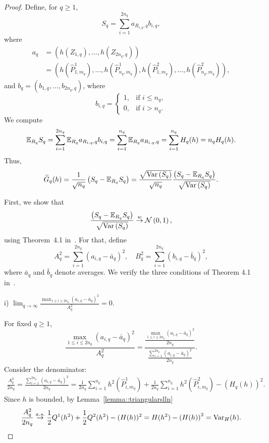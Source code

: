 \begin{proof}
Define, for $q \geq 1$,
\[
S_q = \sum_{i = 1}^{2n_q} a_{R_{i,q},q} b_{i,q},
\]
where
\begin{align*}
a_q & = \left(h\left(Z_{1, q}\right),\dots,h\left(Z_{2n_q,q}\right)\right)\\
& = \left(h\left(\widehat{P}^1_{1,m_q}\right),\dots, h\left(\widehat{P}^1_{n_q,m_q}\right), h\left(\widehat{P}^2_{1,m_q}\right),\dots, h\left(\widehat{P}^2_{n_q,m_q}\right)\right),
\end{align*}
and $b_q = \left(b_{1,q},\dots, b_{2n_q,q} \right)$, where
\[
b_{i,q} =
\begin{cases}
1, & \text{if } i \leq n_q, \\
0, & \text{if } i > n_q .
\end{cases}
\]
We compute
\[
\mathbb{E}_{R_q} S_q
= \sum_{i = 1}^{2n_q} \mathbb{E}_{R_q} a_{R_{i,q},q} b_{i,q}
= \sum_{i = 1}^{n_q} \mathbb{E}_{R_q} a_{R_{i,q},q}
= \sum_{i = 1}^{n_q} H_q(h)
= n_q H_q(h).
\]
Thus,
\[
\widetilde{G}_q(h)
= \frac{1}{\sqrt{n_q}}\left( S_q - \mathbb{E}_{R_q}S_q\right)
= \frac{\sqrt{\mathrm{Var}\left(S_q\right)}}{\sqrt{n_q}}
\frac{\left( S_q - \mathbb{E}_{R_q}S_q\right)}{\sqrt{\mathrm{Var}\left(S_q\right)}}.
\]

First, we show that
\[
\frac{\left( S_q - \mathbb{E}_{R_q}S_q\right)}{\sqrt{\mathrm{Var}\left(S_q\right)}}
\overset{w}{\to} \mathcal{N}\left(0,1\right),
\]
using Theorem~4.1 in~\cite{hajek1961some}. For that, define
\[
A_q^2 = \sum_{i = 1}^{2n_q} \left(a_{i,q} - \bar{a}_q \right)^2, \quad
B_q^2 = \sum_{i = 1}^{2n_q} \left(b_{i,q} - \bar{b}_q \right)^2,
\]
where $\bar{a}_q$ and $\bar{b}_q$ denote averages. We verify the three conditions of Theorem 4.1 in~\cite{hajek1961some}.

i) $\displaystyle \lim_{q \to \infty} \frac{\max_{1 \leq i \leq 2n_q}\left( a_{i,q} - \bar{a}_q \right)^2}{A_q^2} = 0.$
    
    For fixed $q \geq 1$,
    \[
    \frac{\max_{1 \leq i \leq 2n_q}\left( a_{i,q} - \bar{a}_q \right)^2}{A_q^2}
    = \dfrac{\frac{\max_{1 \leq i \leq 2n_q}\left( a_{i,q} - \bar{a}_q \right)^2}{2n_q}}
    {\frac{\sum_{i = 1}^{2n_q}\left( a_{i,q} - \bar{a}_q \right)^2}{2n_q}}.
    \]
    Consider the denominator:
    \begin{align*}
    \frac{A_q^2}{2n_q}
    = \frac{\sum_{i = 1}^{2n_q}\left( a_{i,q} - \bar{a}_q \right)^2}{2n_q}
    = \frac{1}{2n_q}\sum_{i = 1}^{n_q}
    h^2\left( \widehat{P}^1_{i,m_q}\right)
    + \frac{1}{2n_q}\sum_{i = 1}^{n_q}
   h^2 \left(\widehat{P}^2_{i,m_q}\right) - 
   \left(H_q(h)\right)^2.
    \end{align*}
    Since $h$ is bounded, by Lemma~\ref{lemma::triangularslln}
    \[
    \frac{A_q^2}{2n_q}
    \overset{a.s.}{\to}
    \frac{1}{2}Q^1(h^2) + \frac{1}{2}Q^2(h^2) - (H(h))^2
    = H(h^2) - \left(H(h)\right)^2
    = \mathrm{Var}_H(h).
    \]


\end{proof}
